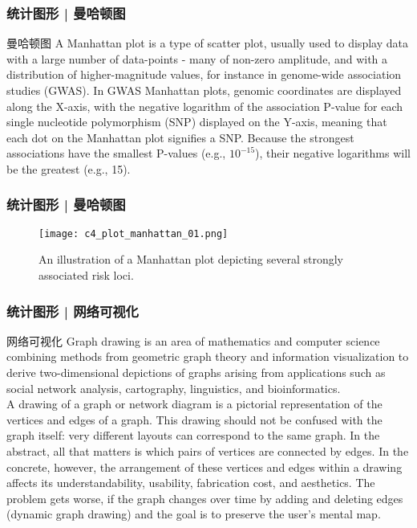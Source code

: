 \begin{frame}
  \frametitle{统计图形 | 曼哈顿图}
  \begin{block}{曼哈顿图}
    A Manhattan plot is a type of scatter plot, usually used to display data with a large number of data-points - many of non-zero amplitude, and with a distribution of higher-magnitude values, for instance in genome-wide association studies (GWAS). In GWAS Manhattan plots, genomic coordinates are displayed along the X-axis, with the negative logarithm of the association P-value for each single nucleotide polymorphism (SNP) displayed on the Y-axis, meaning that each dot on the Manhattan plot signifies a SNP. Because the strongest associations have the smallest P-values (e.g., $10^{-15}$), their negative logarithms will be the greatest (e.g., 15).
  \end{block}
\end{frame}

\begin{frame}
  \frametitle{统计图形 | 曼哈顿图}
  \begin{figure}
    \centering
    \texttt{[image: c4\_plot\_manhattan\_01.png]}
    \caption{An illustration of a Manhattan plot depicting several strongly associated risk loci.}
  \end{figure}
\end{frame}

\begin{frame}
  \frametitle{统计图形 | 网络可视化}
  \begin{block}{网络可视化}
Graph drawing is an area of mathematics and computer science combining methods from geometric graph theory and information visualization to derive two-dimensional depictions of graphs arising from applications such as social network analysis, cartography, linguistics, and bioinformatics.\\
\vspace{0.3em}
A drawing of a graph or network diagram is a pictorial representation of the vertices and edges of a graph. This drawing should not be confused with the graph itself: very different layouts can correspond to the same graph. In the abstract, all that matters is which pairs of vertices are connected by edges. In the concrete, however, the arrangement of these vertices and edges within a drawing affects its understandability, usability, fabrication cost, and aesthetics. The problem gets worse, if the graph changes over time by adding and deleting edges (dynamic graph drawing) and the goal is to preserve the user's mental map.
  \end{block}
\end{frame}

